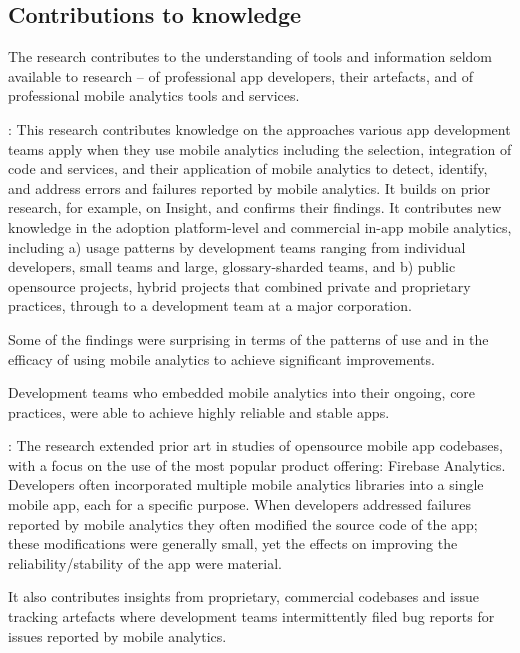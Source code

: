 \subsection{Contributions to knowledge}
The research contributes to the understanding of tools and information seldom available to research -- of professional app developers, their artefacts, and of professional mobile analytics tools and services. 

: 
This research contributes knowledge on the approaches various app development teams apply when they use mobile analytics including the selection, integration of code and services, and their application of mobile analytics to detect, identify, and address errors and failures reported by mobile analytics. It builds on prior research, for example, on Insight, and confirms their findings. It contributes new knowledge in the adoption platform-level and commercial in-app mobile analytics, including a) usage patterns by development teams ranging from individual  developers, small teams and large,  \gls{glossary-sharded} teams, and b) public opensource projects, hybrid projects that combined private and proprietary practices, through to a development team at a major corporation.

Some of the findings were surprising in terms of the patterns of use and in the efficacy of using mobile analytics to achieve significant improvements.

Development teams who embedded mobile analytics into their ongoing, core practices, were able to achieve highly reliable and stable apps. 

: 
The research extended prior art in studies of opensource mobile app codebases, with a focus on the use of the most popular product offering: Firebase Analytics. Developers often incorporated multiple mobile analytics libraries into a single mobile app, each for a specific purpose. When developers addressed failures reported by mobile analytics they often modified the source code of the app; these modifications were generally small, yet the effects on improving the reliability/stability of the app were material. 

It also contributes insights from proprietary, commercial codebases and issue tracking artefacts where development teams intermittently filed bug reports for issues reported by mobile analytics.

